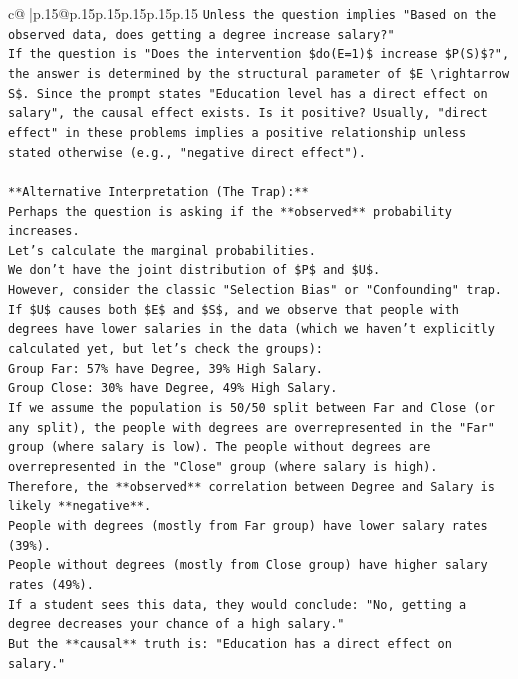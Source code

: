 \documentclass{article}
\begin{document}
{\begin{supertabular}{c@{$\;$}|p{.15\linewidth}@{}p{.15\linewidth}p{.15\linewidth}p{.15\linewidth}p{.15\linewidth}p{.15\linewidth}}
{{{\texttt{Unless the question implies "Based on the observed data, does getting a degree increase salary?"} \\
\texttt{If the question is "Does the intervention \$do(E=1)\$ increase \$P(S)\$?", the answer is determined by the structural parameter of \$E \textbackslash{}rightarrow S\$. Since the prompt states "Education level has a direct effect on salary", the causal effect exists. Is it positive? Usually, "direct effect" in these problems implies a positive relationship unless stated otherwise (e.g., "negative direct effect").} \\
\\ 
\texttt{**Alternative Interpretation (The Trap):**} \\
\texttt{Perhaps the question is asking if the **observed** probability increases.} \\
\texttt{Let's calculate the marginal probabilities.} \\
\texttt{We don't have the joint distribution of \$P\$ and \$U\$.} \\
\texttt{However, consider the classic "Selection Bias" or "Confounding" trap.} \\
\texttt{If \$U\$ causes both \$E\$ and \$S\$, and we observe that people with degrees have lower salaries in the data (which we haven't explicitly calculated yet, but let's check the groups):} \\
\texttt{Group Far: 57\% have Degree, 39\% High Salary.} \\
\texttt{Group Close: 30\% have Degree, 49\% High Salary.} \\
\texttt{If we assume the population is 50/50 split between Far and Close (or any split), the people with degrees are overrepresented in the "Far" group (where salary is low). The people without degrees are overrepresented in the "Close" group (where salary is high).} \\
\texttt{Therefore, the **observed** correlation between Degree and Salary is likely **negative**.} \\
\texttt{People with degrees (mostly from Far group) have lower salary rates (39\%).} \\
\texttt{People without degrees (mostly from Close group) have higher salary rates (49\%).} \\
\texttt{If a student sees this data, they would conclude: "No, getting a degree decreases your chance of a high salary."} \\
\texttt{But the **causal** truth is: "Education has a direct effect on salary."} \\
}}}
\end{supertabular}}
\end{document}

